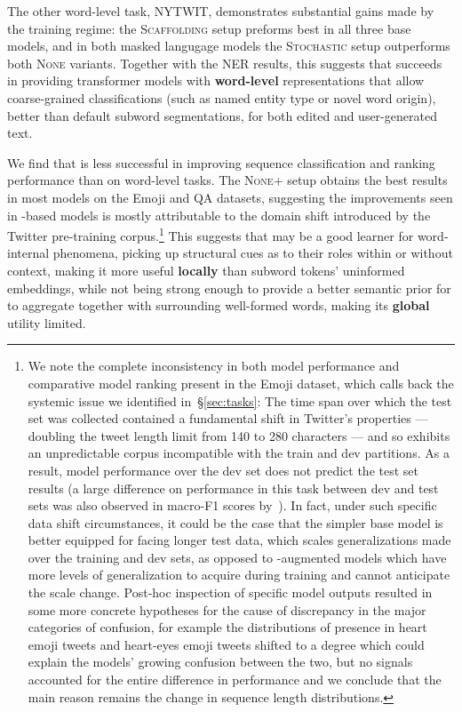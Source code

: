 The other word-level task, NYTWIT, demonstrates substantial gains made by the \tokdetok{} training regime: the \textsc{Scaffolding} setup preforms best in all three base models, and in both masked langugage models the \textsc{Stochastic} setup outperforms both \textsc{None} variants.
Together with the NER results, this suggests that \tokdetok{} succeeds in providing transformer models with \textbf{word-level} representations that allow coarse-grained classifications (such as named entity type or novel word origin), better than default subword segmentations, for both edited and user-generated text.

We find that \tokdetok{} is less successful in improving sequence classification and ranking performance than on word-level tasks.
The \textsc{None+\ppt} setup obtains the best results in most models on the Emoji and QA datasets, suggesting the improvements seen in \tokdetok{}-based models is mostly attributable to the domain shift introduced by the Twitter pre-training corpus.\footnote{We note the complete inconsistency in both model performance and comparative model ranking present in the Emoji dataset, which calls back the systemic issue we identified in~\S\ref{sec:tasks}:
The time span over which the test set was collected contained a fundamental shift in Twitter's properties --- doubling the tweet length limit from 140 to 280 characters --- and so exhibits an unpredictable corpus incompatible with the train and dev partitions.
As a result, model performance over the dev set does not predict the test set results (a large difference on performance in this task between dev and test sets was also observed in macro-F1 scores by~).
In fact, under such specific data shift circumstances, it could be the case that the simpler base model is better equipped for facing longer test data, which scales generalizations made over the training and dev sets, as opposed to \tok{}-augmented models which have more levels of generalization to acquire during training and cannot anticipate the scale change.
Post-hoc inspection of specific model outputs resulted in some more concrete hypotheses for the cause of discrepancy in the major categories of confusion, for example the distributions of  presence in heart emoji
tweets and heart-eyes emoji
tweets shifted to a degree which could explain the models' growing confusion between the two, but no signals accounted for the entire difference in performance and we conclude that the main reason remains the change in sequence length distributions.}
This suggests that \tok{} may be a good learner for word-internal phenomena, picking up structural cues as to their roles within or without context, making it more useful \textbf{locally} than subword tokens' uninformed embeddings, while not being strong enough to provide a better semantic prior for \mmod{} to aggregate together with surrounding well-formed words, making its \textbf{global} utility limited.


